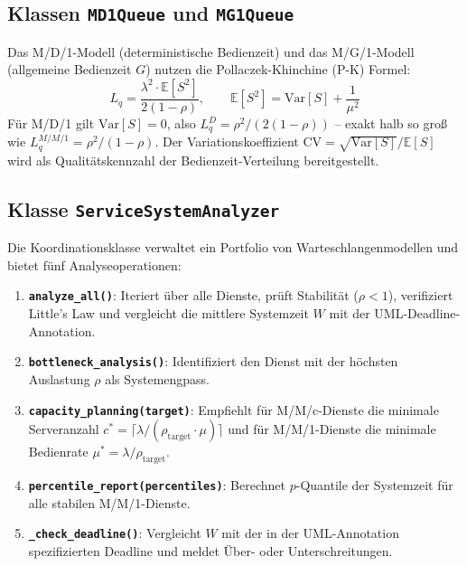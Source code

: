 ﻿\documentclass[a4paper,12pt]{report}
\theoremstyle{definition}
\begin{document}
\subsection{Klassen \texttt{MD1Queue} und \texttt{MG1Queue}}

Das M/D/1-Modell (deterministische Bedienzeit) und das M/G/1-Modell
(allgemeine Bedienzeit $G$) nutzen die Pollaczek-Khinchine (P-K) Formel:
\begin{equation}
	L_q = \frac{\lambda^2 \cdot \mathbb{E}[S^2]}{2(1-\rho)}, \qquad
	\mathbb{E}[S^2] = \mathrm{Var}[S] + \frac{1}{\mu^2}
\end{equation}
Für M/D/1 gilt $\mathrm{Var}[S]=0$, also $L_q^{D} = \rho^2/(2(1-\rho))$
-- exakt halb so groß wie $L_q^{M/M/1} = \rho^2/(1-\rho)$.
Der Variationskoeffizient $\mathrm{CV} = \sqrt{\mathrm{Var}[S]} / \mathbb{E}[S]$
wird als Qualitätskennzahl der Bedienzeit-Verteilung bereitgestellt.

\subsection{Klasse \texttt{ServiceSystemAnalyzer}}

Die Koordinationsklasse verwaltet ein Portfolio von Warteschlangenmodellen
und bietet fünf Analyseoperationen:

\begin{enumerate}
	\item[-] \textbf{\texttt{analyze\_all()}}: Iteriert über alle Dienste,
	prüft Stabilität ($\rho < 1$), verifiziert Little's Law und
	vergleicht die mittlere Systemzeit $W$ mit der UML-Deadline-Annotation.
	\item[-] \textbf{\texttt{bottleneck\_analysis()}}: Identifiziert den
	Dienst mit der höchsten Auslastung $\rho$ als Systemengpass.
	\item[-] \textbf{\texttt{capacity\_planning(target)}}:
	Empfiehlt für M/M/c-Dienste die minimale Serveranzahl
	$c^* = \lceil \lambda / (\rho_\text{target} \cdot \mu) \rceil$
	und für M/M/1-Dienste die minimale Bedienrate
	$\mu^* = \lambda / \rho_\text{target}$.
	\item[-] \textbf{\texttt{percentile\_report(percentiles)}}:
	Berechnet $p$-Quantile der Systemzeit für alle stabilen M/M/1-Dienste.
	\item[-] \textbf{\texttt{\_check\_deadline()}}: Vergleicht $W$ mit der
	in der UML-Annotation spezifizierten Deadline und meldet Über- oder
	Unterschreitungen.
\end{enumerate}
\end{document}
